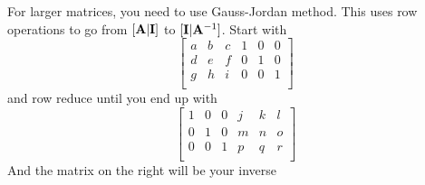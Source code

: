\documentclass{article}
\begin{document}
For larger matrices, you need to use Gauss-Jordan method.  This uses row operations to go from $[\vb{A} | \vb{I}]$ to $[\vb{I} | \vb{A}^{-1}]$. Start with
$$
\begin{bmatrix}
a & b & c & 1 & 0 & 0 \\
d & e & f & 0 & 1 & 0 \\
g & h & i & 0 & 0 & 1 \\
\end{bmatrix}
$$
and row reduce until you end up with 
$$
\begin{bmatrix}
1 & 0 & 0 & j & k & l \\
0 & 1 & 0 & m & n & o \\
0 & 0 & 1 & p & q & r \\
\end{bmatrix}
$$
And the matrix on the right will be your inverse
\end{document}
